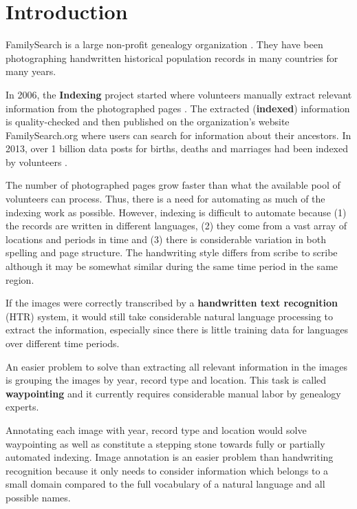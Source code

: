 
\chapter{Introduction}

FamilySearch is a large non-profit genealogy organization \cite{FamilySearchAbout}. They have been photographing handwritten historical population records in many countries for many years.

In 2006, the \textbf{Indexing} project started where volunteers manually extract relevant information from the photographed pages \cite{Indexing}. The extracted (\textbf{indexed}) information is quality-checked and then published on the organization's website FamilySearch.org where users can search for information about their ancestors.
In 2013, over 1 billion data posts for births, deaths and marriages had been indexed by volunteers \cite{Billion}.

The number of photographed pages grow faster than what the available pool of volunteers can process. Thus, there is a need for automating as much of the indexing work as possible. However, indexing is difficult to automate because (1) the records are written in different languages, (2) they come from a vast array of locations and periods in time and (3) there is considerable variation in both spelling and page structure.
The handwriting style differs from scribe to scribe although it may be somewhat similar during the same time period in the same region.

If the images were correctly transcribed by a \textbf{handwritten text recognition} (HTR) system, it would still take considerable natural language processing to extract the information, especially since there is little training data for languages over different time periods.

An easier problem to solve than extracting all relevant information in the images is grouping the images by year, record type and location. This task is called \textbf{waypointing} \cite{Waypointing} and it currently requires considerable manual labor by genealogy experts.

Annotating each image with year, record type and location would solve waypointing as well as constitute a stepping stone towards fully or partially automated indexing.
Image annotation is an easier problem than handwriting recognition because it only needs to consider information which belongs to a small domain compared to the full vocabulary of a natural language and all possible names.





